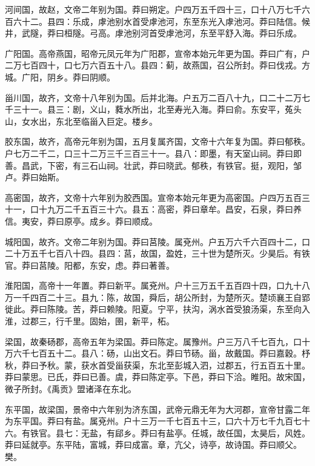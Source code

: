 \documentclass[12pt,UTF8]{ctexbook}
\begin{document}
河间国，故赵，文帝二年别为国。莽曰朔定。户四万五千四十三，口十八万七千六百六十二。县四：乐成，虖池别水首受虖池河，东至东光入虖池河。莽曰陆信。候井，武隧，莽曰桓隧。弓高。虖池别河首受虖池河，东至平舒入海。莽曰乐成。



广阳国。高帝燕国，昭帝元凤元年为广阳郡，宣帝本始元年更为国。莽曰广有，户二万七百四十，口七万六百五十八。县四：蓟，故燕国，召公所封。莽曰伐戎。方城。广阳，阴乡。莽曰阴顺。



甾川国，故齐，文帝十八年别为国。后并北海。户五万二百八十九，口二十二万七千三十一。县三：剧，义山，蕤水所出，北至寿光入海。莽曰俞。东安平，菟头山，女水出，东北至临甾入巨定。楼乡。



胶东国，故齐，高帝元年别为国，五月复属齐国，文帝十六年复为国。莽曰郁秩。户七万二千二，口三十二万三千三百三十一。县八：即墨，有天室山祠。莽曰即善。昌武，下密，有三石山祠。壮武，莽曰晓武。郁秩，有铁官。挺，观阳，邹卢。莽曰始斯。



高密国，故齐，文帝十六年别为胶西国。宣帝本始元年更为高密国。户四万五百三十一，口十九万二千五百三十六。县五：高密，莽曰章牟。昌安，石泉，莽曰养信。夷安，莽曰原亭。成乡。莽曰顺成。



城阳国，故齐。文帝二年别为国。莽曰莒陵。属兗州。户五万六千六百四十二，口二十万五千七百八十四。县四：莒，故国，盈姓，三十世为楚所灭。少昊后。有铁官。莽曰莒陵。阳都，东安，虑。莽曰著善。



淮阳国，高帝十一年置。莽曰新平。属兗州。户十三万五千五百四十四，口九十八万一千四百二十三。县九：陈，故国，舜后，胡公所封，为楚所灭。楚顷襄王自郢徙此。莽曰陈陵。苦，莽曰赖陵。阳夏。宁平，扶沟，涡水首受狼汤渠，东至向入淮，过郡三，行千里。固始，圉，新平，柘。



梁国，故秦砀郡，高帝五年为梁国。莽曰陈定。属豫州。户三万八千七百九，口十万六千七百五十二。县八：砀，山出文石。莽曰节砀。甾，故戴国。莽曰嘉穀。杼秋，莽曰予秋。蒙，获水首受甾获渠，东北至彭城入泗，过郡五，行五百五十里。莽曰蒙思。已氏，莽曰已善。虞，莽曰陈定亭。下邑，莽曰下洽。睢阳。故宋国，微子所封。《禹贡》盟诸泽在东北。



东平国，故梁国，景帝中六年别为济东国，武帝元鼎无年为大河郡，宣帝甘露二年为东平国。莽曰有盐。属兗州。户十三万一千七百五十三，口六十万七千九百七十六。有铁官。县七：无盐，有郈乡。莽曰有盐亭。任城，故任国，太昊后，风姓。莽曰延就亭。东平陆，富城，莽曰成富。章，亢父，诗亭，故诗国。莽曰顺父。樊。
\end{document}
